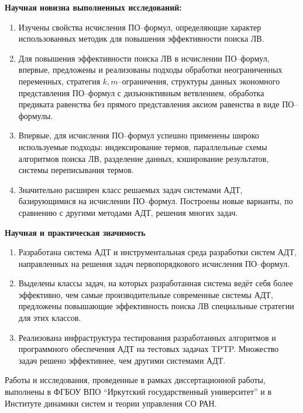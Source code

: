 \documentclass[a4paper]{report}
\begin{document}
\textbf{Научная новизна выполненных исследований:}
\begin{enumerate}
\item Изучены свойства исчисления ПО--формул, определяющие характер использованных методик для повышения эффективности поиска ЛВ.
\item Для повышения эффективности поиска ЛВ в исчислении ПО--формул, впервые, предложены и реализованы подходы обработки неограниченных переменных, стратегия $k,m$--ограничения, структуры данных экономного представления ПО--формул с дизъюнктивным ветвлением, обработка предиката равенства без прямого представления аксиом равенства в виде ПО--формулы.
\item Впервые, для исчисления ПО--формул успешно применены широко используемые подходы: индексирование термов, параллельные схемы алгоритмов поиска ЛВ, разделение данных, кэширование результатов, системы переписывания термов.
\item Значительно расширен класс решаемых задач системами АДТ, базирующимися на исчислении ПО--формул. Построены новые варианты, по сравнению с другими методами АДТ, решения многих задач.
\end{enumerate}


\textbf{Научная и практическая значимость}
\begin{enumerate}
\item Разработана система АДТ и инструментальная среда разработки систем АДТ, направленных на решения задач первопорядкового исчисления ПО--формул.
\item Выделены классы задач, на которых разработанная система ведёт себя более эффективно, чем самые производительные современные системы АДТ, предложены повышающие эффективность поиска ЛВ специальные стратегии для этих классов.
\item Реализована инфраструктура тестирования разработанных алгоритмов и программного обеспечения АДТ на тестовых задачах TPTP. Множество задач решено эффективнее, чем другими системами АДТ.
\end{enumerate}


Работы и исследования, проведенные в рамках  диссертационной работы, выполнены в ФГБОУ ВПО ``Иркутский государственный университет'' и в Институте динамики систем и теории управления СО РАН.
\end{document}
